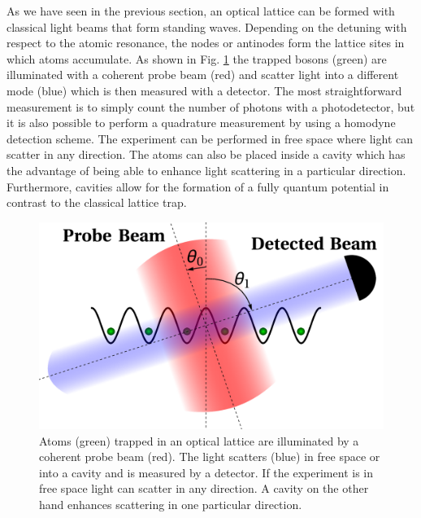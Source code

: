 
As we have seen in the previous section, an optical lattice can be
formed with classical light beams that form standing waves. Depending
on the detuning with respect to the atomic resonance, the nodes or
antinodes form the lattice sites in which atoms accumulate. As shown
in Fig. \ref{fig:LatticeDiagram} the trapped bosons (green) are
illuminated with a coherent probe beam (red) and scatter light into a
different mode (blue) which is then measured with a detector. The most
straightforward measurement is to simply count the number of photons
with a photodetector, but it is also possible to perform a quadrature
measurement by using a homodyne detection scheme. The experiment can
be performed in free space where light can scatter in any
direction. The atoms can also be placed inside a cavity which has the
advantage of being able to enhance light scattering in a particular
direction. Furthermore, cavities allow for the formation of a fully
quantum potential in contrast to the classical lattice trap.

\begin{figure}[htbp!]
  \centering
  \includegraphics[width=1.0\textwidth]{LatticeDiagram}
  \caption[LatticeDiagram]{Atoms (green) trapped in an optical lattice
    are illuminated by a coherent probe beam (red). The light scatters
    (blue) in free space or into a cavity and is measured by a
    detector. If the experiment is in free space light can scatter in
    any direction. A cavity on the other hand enhances scattering in
    one particular direction.}
  \label{fig:LatticeDiagram}
\end{figure}

